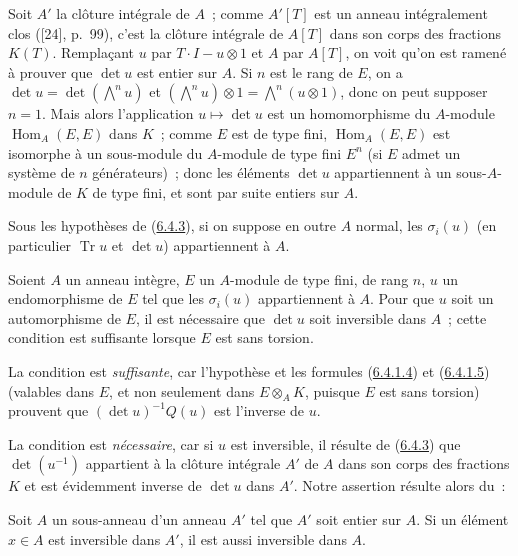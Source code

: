 Soit $A'$ la clôture intégrale de $A$~; comme $A'[T]$ est un anneau
intégralement clos ([24], p.~99), c'est la clôture intégrale de
$A[T]$ dans son corps des fractions $K(T)$. Remplaçant $u$ par
$T\cdot I-u\otimes1$ et $A$ par $A[T]$, on voit qu'on est ramené à prouver que
$\det u$ est entier sur $A$. Si $n$ est le rang de $E$, on a
$\det u=\det(\bigwedge^n u)$ et
$(\bigwedge^n u)\otimes1=\bigwedge^n(u\otimes1)$, donc on peut supposer
$n=1$. Mais alors l'application $u\mapsto\det u$ est un homomorphisme du
$A$-module $\operatorname{Hom}_A(E,E)$ dans $K$~; comme $E$ est de type fini,
$\operatorname{Hom}_A(E,E)$ est isomorphe à un sous-module du $A$-module de
type fini $E^n$ (si $E$ admet un système de $n$ générateurs)~; donc les
éléments $\det u$ appartiennent à un sous-$A$-module de $K$ de type fini, et
sont par suite entiers sur $A$.


\begin{corollary}[6.4.4]
\label{II.6.4.4-fr}
Sous les hypothèses de (\hyperref[II.6.4.3-fr]{6.4.3}), si on suppose en outre
$A$ normal, les $\sigma_i(u)$ (en particulier $\operatorname{Tr}u$ et
$\det u$) appartiennent à $A$.
\end{corollary}

\begin{proposition}[6.4.5]
\label{II.6.4.5-fr}
Soient $A$ un anneau intègre, $E$ un $A$-module de type fini, de rang $n$, $u$
un endomorphisme de $E$ tel que les $\sigma_i(u)$ appartiennent à $A$. Pour
que $u$ soit un automorphisme de $E$, il est nécessaire que $\det u$ soit
inversible dans $A$~; cette condition est suffisante lorsque $E$ est sans
torsion.
\end{proposition}

La condition est \emph{suffisante}, car l'hypothèse et les formules
(\hyperref[II.6.4.1.4-fr]{6.4.1.4}) et
(\hyperref[II.6.4.1.5-fr]{6.4.1.5}) (valables dans $E$, et non seulement dans
$E\otimes_AK$, puisque $E$ est sans torsion) prouvent que
$(\det u)^{-1}Q(u)$ est l'inverse de $u$.

La condition est \emph{nécessaire}, car si $u$ est inversible, il résulte de
(\hyperref[II.6.4.3-fr]{6.4.3}) que $\det(u^{-1})$ appartient à la clôture
intégrale $A'$ de $A$ dans son corps des fractions $K$ et est évidemment
inverse de $\det u$ dans $A'$. Notre assertion résulte alors du~:

\begin{lemma}[6.4.5.1]
\label{II.6.4.5.1-fr}
Soit $A$ un sous-anneau d'un anneau $A'$ tel que $A'$ soit entier sur $A$. Si
un élément $x\in A$ est inversible dans $A'$, il est aussi inversible dans
$A$.
\end{lemma}

